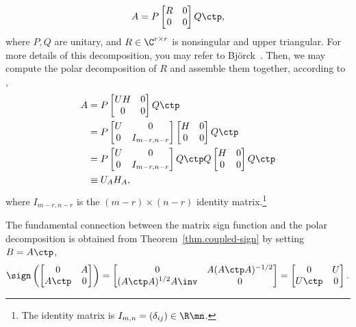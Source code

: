 \begin{equation}\notag
  A = P
  \begin{bmatrix}
    R & 0 \\ 0 & 0 
  \end{bmatrix}
  Q\ctp,
\end{equation}
where $P,Q$ are unitary, and $R\in\C^{r\times r}$ is nonsingular and upper
triangular. For more details of this decomposition, you may refer to
Bj\"{o}rck~. Then, we may compute
the polar decomposition of $R$ and assemble them together, according to
,
\begin{align*}
  A & = P
      \begin{bmatrix}
        UH & 0 \\ 0 & 0
      \end{bmatrix}
      Q\ctp \\
    & = P
      \begin{bmatrix}
        U & 0 \\ 0 & I_{m-r,n-r}
      \end{bmatrix}
      \begin{bmatrix}
        H & 0 \\ 0 & 0
      \end{bmatrix} Q\ctp \\
    & = P
      \begin{bmatrix}
        U & 0 \\ 0 & I_{m-r,n-r}
      \end{bmatrix}
      Q\ctp Q
      \begin{bmatrix}
        H & 0 \\ 0 & 0
      \end{bmatrix} Q\ctp \\
    & \equiv U_{A}H_{A},
\end{align*}
where $I_{m-r,n-r}$ is the $(m-r)\times (n-r)$ identity
matrix.\footnote{The identity matrix is $I_{m,n} = (\delta_{ij})\in\R\mn$.
  }


The fundamental connection between the matrix sign function and the polar
decomposition is obtained from Theorem~\ref{thm.coupled-sign} by setting
$B = A\ctp$,
\begin{equation}\notag
  \sign \left(
  \begin{bmatrix}
    0 & A \\ A\ctp & 0
  \end{bmatrix}
  \right) =
  \begin{bmatrix}
    0 & A(A\ctp A)^{-1/2} \\ (A\ctp A)^{1/2}A\inv & 0
  \end{bmatrix}
  =
  \begin{bmatrix}
    0 & U \\ U\ctp & 0
  \end{bmatrix}.
\end{equation}








